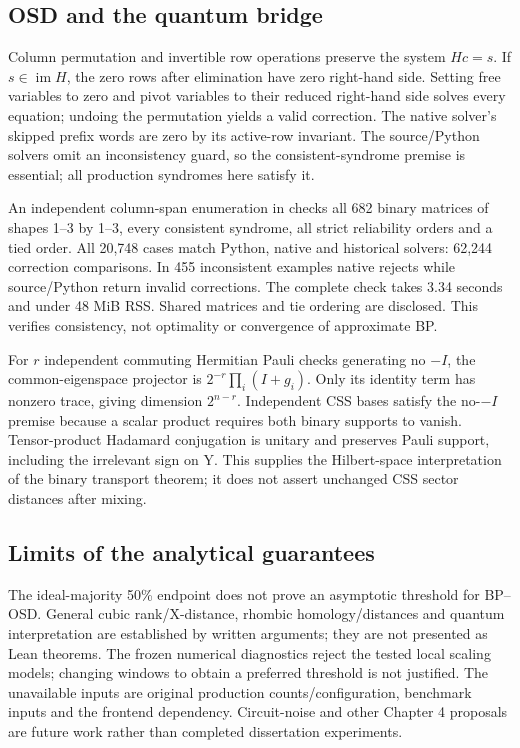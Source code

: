 \subsection{OSD and the quantum bridge}
Column permutation and invertible row operations preserve the system $Hc=s$. If $s\in\operatorname{im}H$, the zero rows after elimination have zero right-hand side. Setting free variables to zero and pivot variables to their reduced right-hand side solves every equation; undoing the permutation yields a valid correction. The native solver's skipped prefix words are zero by its active-row invariant. The source/Python solvers omit an inconsistency guard, so the consistent-syndrome premise is essential; all production syndromes here satisfy it.

An independent column-span enumeration in  checks all 682 binary matrices of shapes 1--3 by 1--3, every consistent syndrome, all strict reliability orders and a tied order. All 20,748 cases match Python, native and historical solvers: 62,244 correction comparisons. In 455 inconsistent examples native rejects while source/Python return invalid corrections. The complete check takes 3.34 seconds and under 48 MiB RSS. Shared matrices and tie ordering are disclosed. This verifies consistency, not optimality or convergence of approximate BP.

For $r$ independent commuting Hermitian Pauli checks generating no $-I$, the common-eigenspace projector is $2^{-r}\prod_i(I+g_i)$. Only its identity term has nonzero trace, giving dimension $2^{n-r}$. Independent CSS bases satisfy the no-$-I$ premise because a scalar product requires both binary supports to vanish. Tensor-product Hadamard conjugation is unitary and preserves Pauli support, including the irrelevant sign on Y. This supplies the Hilbert-space interpretation of the binary transport theorem; it does not assert unchanged CSS sector distances after mixing.

\subsection{Limits of the analytical guarantees}
The ideal-majority 50\% endpoint does not prove an asymptotic threshold for BP--OSD. General cubic rank/X-distance, rhombic homology/distances and quantum interpretation are established by written arguments; they are not presented as Lean theorems. The frozen numerical diagnostics reject the tested local scaling models; changing windows to obtain a preferred threshold is not justified. The unavailable inputs are original production counts/configuration, benchmark inputs and the frontend dependency. Circuit-noise and other Chapter 4 proposals are future work rather than completed dissertation experiments.


